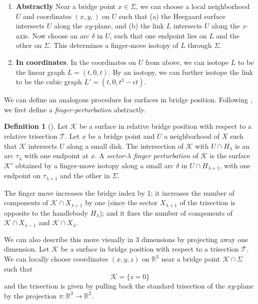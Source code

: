 \documentclass[11pt]{amsart}
\theoremstyle{definition}
\newtheorem{definition}[theorem]{Definition}
\theoremstyle{remark}
\numberwithin{equation}{section}
\newcommand{\cT}{\mathcal{T}}
\newcommand{\cK}{\mathcal{K}}
\newcommand{\RR}{\mathbb{R}}
\begin{document}
\begin{enumerate}
    \item {\bf Abstractly} Near a bridge point $x \in \Sigma$, we can choose a local neighborhood $U$ and coordinates $(x,y,)$ on $U$ such that (a) the Heegaard surface intersects $U$ along the $xy$-plane, and (b) the link $L$ intersects $U$ along the $z$-axis.  Now choose an arc $\delta$ in $U$, such that one endpoint lies on $L$ and the other on $\Sigma$.  This determines a finger-move isotopy of $L$ through $\Sigma$.
    \item {\bf In coordinates}.  In the coordinates on $U$ from above, we can isotope $L$ to be the linear graph $L = (t,0,t)$.  By an isotopy, we can further isotope
 the link to be the cubic graph $L' = (t,0,t^3 - \epsilon t)$.
\end{enumerate}

We can define an analogous procedure for surfaces in bridge position.  Following \cite[Definition 9.9]{Meier-Relative-Bridge}, we first define a {\it finger-perturbation} abstractly.

\begin{definition}[\cite{Meier-Relative-Bridge}]
Let $\cK$ be a surface in relative bridge position with respect to a relative trisection $\cT$.  Let $x$ be a bridge point and $U$ a neighborhood of $X$ such that $\cK$ intersects $U$ along a small disk.  The intersection of $\cK$ with $U \cap H_{\lambda}$ is an arc $\tau_{\lambda}$ with one endpoint at $x$.  A {\it sector-$\lambda$ finger perturbation} of $\cK$ is the surface $\cK'$ obtained by a finger-move isotopy along a small arc $\delta$ in $U \cap H_{\lambda+1}$, with one endpoint on $\tau_{\lambda+1}$ and the other in $\Sigma$.
\end{definition}

The finger move increases the bridge index by 1; it increases the number of components of $\cK \cap X_{\lambda+1}$ by one (since the sector $X_{\lambda+1}$ of the trisection is opposite to the handlebody $H_{\lambda}$); and it fixes the number of components of $\cK \cap X_{\lambda-1}$ and $\cK \cap X_{\lambda}$.

We can also describe this move visually in 3 dimensions by projecting away one dimension.  Let $\cK$ be a surface in bridge position with respect to a trisection $\cT$.  We can locally choose coordinates $(x,y,z)$ on $\RR^3$ near a bridge point $\cK \cap \Sigma$ such that
\[ \cK = \{ z = 0\}\]
and the trisection is given by pulling back the standard trisection of the $xy$-plane by the projection $\pi: \RR^3 \rightarrow \RR^2$.
\end{document}
